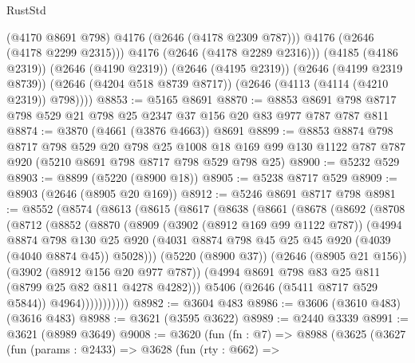 \begin{lexlean}{RustStd}
\begin{coremodule}
              (@4170 @8691 @798)
              @4176
              (@2646 (@4178 @2309 @787)))
            @4176
            (@2646 (@4178 @2299 @2315)))
          @4176
          (@2646 (@4178 @2289 @2316)))
        (@4185 (@4186 @2319))
        (@2646 (@4190 @2319))
        (@2646 (@4195 @2319))
        (@2646 (@4199 @2319 @8739))
        (@2646 (@4204 @518 @8739 @8717))
        (@2646 (@4113 (@4114 (@4210 @2319)) @798))))
@8853 := @5165 @8691
@8870 := @8853 @8691 @798 @8717 @798 @529 @21 @798 @25 @2347 @37 @156 @20 @83 @977 @787 @787 @811
@8874 := @3870 (@4661 (@3876 @4663)) @8691
@8899 := @8853
    @8874
    @798
    @8717
    @798
    @529
    @20
    @798
    @25
    @1008
    @18
    @169
    @99
    @130
    @1122
    @787
    @787
    @920
    (@5210 @8691 @798 @8717 @798 @529 @798 @25)
@8900 := @5232 @529
@8903 := @8899 (@5220 (@8900 @18))
@8905 := @5238 @8717 @529
@8909 := @8903 (@2646 (@8905 @20 @169))
@8912 := @5246 @8691 @8717 @798
@8981 := @8552
    (@8574
      (@8613
        (@8615
          (@8617
            (@8638
              (@8661
                (@8678
                  (@8692
                    (@8708
                      (@8712
                        (@8852
                          (@8870
                            (@8909
                              (@3902 (@8912 @169 @99 @1122 @787))
                              (@4994
                                @8874
                                @798
                                @130
                                @25
                                @920
                                (@4031
                                  @8874
                                  @798
                                  @45
                                  @25
                                  @45
                                  @920
                                  (@4039 (@4040 @8874 @45))
                                  @5028)))
                            (@5220 (@8900 @37))
                            (@2646 (@8905 @21 @156))
                            (@3902 (@8912 @156 @20 @977 @787))
                            (@4994 @8691 @798 @83 @25 @811 (@8799 @25 @82 @811 @4278 @4282)))
                          @5406
                          (@2646 (@5411 @8717 @529 @5844))
                          @4964)))))))))))
@8982 := @3604 @483
@8986 := @3606 (@3610 @483) (@3616 @483)
@8988 := @3621 (@3595 @3622)
@8989 := @2440 @3339
@8991 := @3621 (@8989 @3649)
@9008 := @3620
    (fun (fn : @7) =>
    @8988
      (@3625
        (@3627
          (fun (params : @2433) =>
          @3628
            (fun (rty : @662) =>

\end{coremodule}
\end{lexlean}
